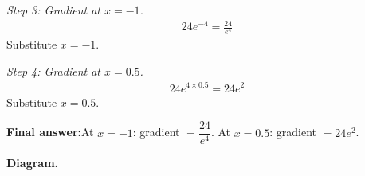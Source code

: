 \documentclass[11pt]{article}
\begin{document}
\textit{Step 3: Gradient at \( x = -1 \).}
\[\begin{gathered}
24e^{-4} = \frac{24}{e^4}
\end{gathered}\]
Substitute \( x = -1 \).

\textit{Step 4: Gradient at \( x = 0.5 \).}
\[\begin{gathered}
24e^{4 \times 0.5} = 24e^{2}
\end{gathered}\]
Substitute \( x = 0.5 \).

\begin{answerbox}
\textbf{Final answer:}\quad At \(\displaystyle  x = -1 \): gradient \(\displaystyle  = \dfrac{24}{e^4} \). At \(\displaystyle  x = 0.5 \): gradient \(\displaystyle  = 24e^2 \).
\end{answerbox}
\textbf{Diagram.}

\begin{center}
\end{center}
\end{document}
